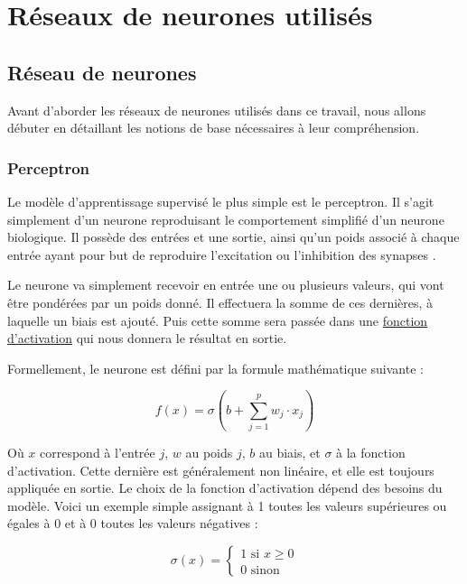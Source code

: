 \chapter{Réseaux de neurones utilisés} %
\label{UsedModels} %


\section{Réseau de neurones}
\label{sec:nn}

Avant d'aborder les réseaux de neurones utilisés dans ce travail, nous allons débuter en détaillant les notions de base nécessaires à leur compréhension.

\subsection{Perceptron}
\label{sec:perceptron}

Le modèle d'apprentissage supervisé le plus simple est le perceptron. Il s'agit simplement d'un neurone reproduisant le comportement simplifié d'un neurone biologique. Il possède des entrées et une sortie, ainsi qu'un poids associé à chaque entrée ayant pour but de reproduire l'excitation ou l'inhibition des synapses \cite{fleuret_deep_nodate-4}.

Le neurone va simplement recevoir en entrée une ou plusieurs valeurs, qui vont être pondérées par un poids donné. Il effectuera la somme de ces dernières, à laquelle un biais est ajouté. Puis cette somme sera passée dans une \hyperref[sec:fa]{fonction d'activation} qui nous donnera le résultat en sortie.

Formellement, le neurone est défini par la formule mathématique suivante :

\[f(x)=\sigma(b+\sum_{j=1}^{p}w_j \cdot x_j)\]

Où $x$ correspond à l'entrée $j$, $w$ au poids $j$, $b$ au biais, et $\sigma$ à la fonction d'activation. Cette dernière est généralement non linéaire, et elle est toujours appliquée en sortie. Le choix de la fonction d'activation dépend des besoins du modèle. Voici un exemple simple assignant à 1 toutes les valeurs supérieures ou égales à 0 et à 0 toutes les valeurs négatives :

\[\sigma(x)= \begin{cases}
    1 \text{ si } x \geq 0\\
    0 \text{ sinon}
    \end{cases}
\]

